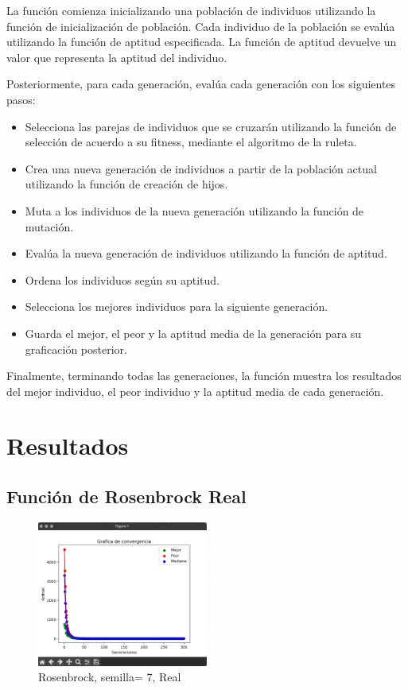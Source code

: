 \documentclass{report}
\begin{document}
    La función comienza inicializando una población de individuos utilizando la función de inicialización de población. Cada individuo de la
    población se evalúa utilizando la función de aptitud especificada. La función de aptitud devuelve un valor que representa la aptitud del individuo.

    Posteriormente, para cada generación, evalúa cada generación con los siguientes pasos:
    \begin{itemize}
        \item Selecciona las parejas de individuos que se cruzarán utilizando la función de selección de acuerdo a su fitness, mediante el algoritmo de la ruleta.
        \item Crea una nueva generación de individuos a partir de la población actual utilizando la función de creación de hijos.
        \item Muta a los individuos de la nueva generación utilizando la función de mutación.
        \item Evalúa la nueva generación de individuos utilizando la función de aptitud.
        \item Ordena los individuos según su aptitud.
        \item Selecciona los mejores individuos para la siguiente generación.
        \item Guarda el mejor, el peor y la aptitud media de la generación para su graficación posterior.
    \end{itemize}

    Finalmente, terminando todas las generaciones, la función muestra los resultados del mejor individuo, el peor individuo y la aptitud media de cada generación.

    \newpage

    \section*{Resultados}
    \subsection*{Función de Rosenbrock Real}
    \begin{figure}[h]
        \centering
        \includegraphics[width=0.5\textwidth]{rosenbrock_7_re.jpeg}
        \caption{Rosenbrock, semilla= 7, Real}
    \end{figure}
\end{document}
